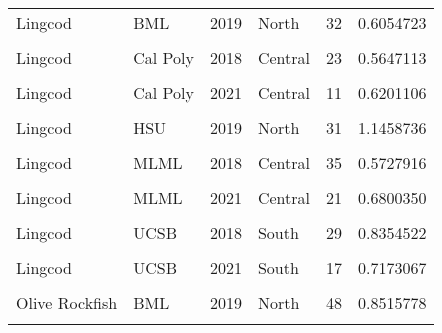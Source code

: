 \documentclass[
]{article}
\begin{document}
\begin{longtable}[t]{llrlrr}
\addlinespace
Lingcod & BML & 2019 & North & 32 & 0.6054723\\
\cellcolor{gray!6}{Lingcod} & \cellcolor{gray!6}{BML} & \cellcolor{gray!6}{2021} & \cellcolor{gray!6}{North} & \cellcolor{gray!6}{24} & \cellcolor{gray!6}{0.8820949}\\
Lingcod & Cal Poly & 2018 & Central & 23 & 0.5647113\\
\cellcolor{gray!6}{Lingcod} & \cellcolor{gray!6}{Cal Poly} & \cellcolor{gray!6}{2019} & \cellcolor{gray!6}{Central} & \cellcolor{gray!6}{17} & \cellcolor{gray!6}{0.5948597}\\
Lingcod & Cal Poly & 2021 & Central & 11 & 0.6201106\\
\addlinespace
\cellcolor{gray!6}{Lingcod} & \cellcolor{gray!6}{HSU} & \cellcolor{gray!6}{2018} & \cellcolor{gray!6}{North} & \cellcolor{gray!6}{52} & \cellcolor{gray!6}{1.5401781}\\
Lingcod & HSU & 2019 & North & 31 & 1.1458736\\
\cellcolor{gray!6}{Lingcod} & \cellcolor{gray!6}{HSU} & \cellcolor{gray!6}{2021} & \cellcolor{gray!6}{North} & \cellcolor{gray!6}{23} & \cellcolor{gray!6}{1.5179207}\\
Lingcod & MLML & 2018 & Central & 35 & 0.5727916\\
\cellcolor{gray!6}{Lingcod} & \cellcolor{gray!6}{MLML} & \cellcolor{gray!6}{2019} & \cellcolor{gray!6}{Central} & \cellcolor{gray!6}{35} & \cellcolor{gray!6}{0.6250646}\\
\addlinespace
Lingcod & MLML & 2021 & Central & 21 & 0.6800350\\
\cellcolor{gray!6}{Lingcod} & \cellcolor{gray!6}{SIO} & \cellcolor{gray!6}{2019} & \cellcolor{gray!6}{South} & \cellcolor{gray!6}{1} & \cellcolor{gray!6}{0.3750000}\\
Lingcod & UCSB & 2018 & South & 29 & 0.8354522\\
\cellcolor{gray!6}{Lingcod} & \cellcolor{gray!6}{UCSB} & \cellcolor{gray!6}{2019} & \cellcolor{gray!6}{South} & \cellcolor{gray!6}{18} & \cellcolor{gray!6}{0.5330049}\\
Lingcod & UCSB & 2021 & South & 17 & 0.7173067\\
\addlinespace
\cellcolor{gray!6}{Olive Rockfish} & \cellcolor{gray!6}{BML} & \cellcolor{gray!6}{2018} & \cellcolor{gray!6}{North} & \cellcolor{gray!6}{38} & \cellcolor{gray!6}{1.2005617}\\
Olive Rockfish & BML & 2019 & North & 48 & 0.8515778\\
\cellcolor{gray!6}{Olive Rockfish} & \cellcolor{gray!6}{BML} & \cellcolor{gray!6}{2021} & \cellcolor{gray!6}{North} & \cellcolor{gray!6}{12} & \cellcolor{gray!6}{0.5858886}\\

\end{longtable}
\end{document}
